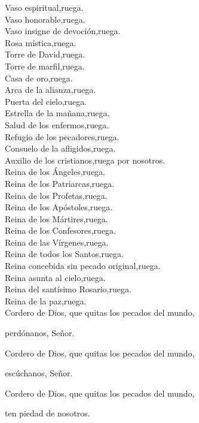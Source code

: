 Vaso espiritual,\hfill ruega.\\
Vaso honorable,\hfill ruega.\\
Vaso insigne de devoción,\hfill ruega.\\
Rosa mística,\hfill ruega.\\
Torre de David,\hfill ruega.\\
Torre de marfil,\hfill ruega.\\
Casa de oro,\hfill ruega.\\
Arca de la alianza,\hfill ruega.\\
Puerta del cielo,\hfill ruega.\\
Estrella de la mañana,\hfill ruega.\\
Salud de los enfermos,\hfill ruega.\\
Refugio de los pecadores,\hfill ruega.\\
Consuelo de la afligidos,\hfill ruega.\\
Auxilio de los cristianos,\hfill ruega por nosotros.\\
Reina de los Ángeles,\hfill ruega.\\
Reina de los Patriarcas,\hfill ruega.\\
Reina de los Profetas,\hfill ruega.\\
Reina de los Apóstoles,\hfill ruega.\\
Reina de los Mártires,\hfill ruega.\\
Reina de los Confesores,\hfill ruega.\\
Reina de las Vírgenes,\hfill ruega.\\
Reina de todos los Santos,\hfill ruega.\\
Reina concebida sin pecado original,\hfill ruega.\\
Reina asunta al cielo,\hfill ruega.\\
Reina del santísimo Rosario,\hfill ruega.\\
Reina de la paz,\hfill ruega.\\
Cordero de Dios, que quitas los pecados del mundo,

\hfill perdónanos, Señor.

\noindent Cordero de Dios, que quitas los pecados del mundo,

\hfill escúchanos, Señor.

\noindent Cordero de Dios, que quitas los pecados del mundo,

\hfill ten piedad de nosotros.

